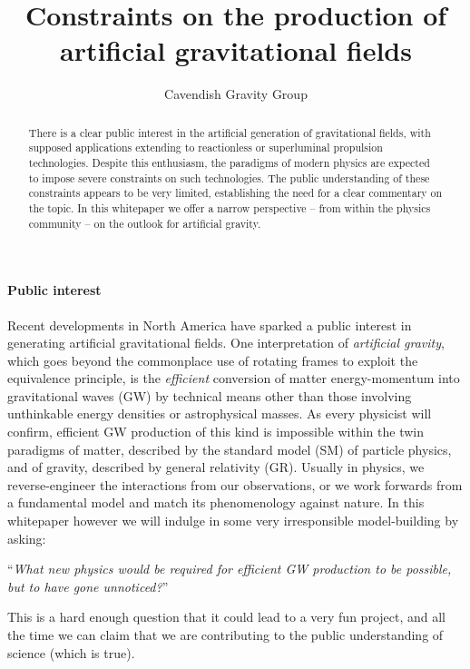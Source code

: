 \documentclass[aps,prd,reprint,preprintnumbers,showpacs,floatfix,nofootinbib,superscript address,longbibliography]{revtex4-2}
\begin{document}
\title{Constraints on the production of artificial gravitational fields}

\author{Cavendish Gravity Group}


\begin{abstract}
	There is a clear public interest in the artificial generation of gravitational fields, with supposed applications extending to reactionless or superluminal propulsion technologies. Despite this enthusiasm, the paradigms of modern physics are expected to impose severe constraints on such technologies. The public understanding of these constraints appears to be very limited, establishing the need for a clear commentary on the topic. In this whitepaper we offer a narrow perspective -- from within the physics community -- on the outlook for artificial gravity.
\end{abstract}

\maketitle

\paragraph*{Public interest} Recent developments in North America have sparked a public interest in generating artificial gravitational fields. One interpretation of \emph{artificial gravity}, which goes beyond the commonplace use of rotating frames to exploit the equivalence principle, is the \emph{efficient} conversion of matter energy-momentum into gravitational waves (GW) by technical means other than those involving unthinkable energy densities or astrophysical masses. As every physicist will confirm, efficient GW production of this kind is impossible within the twin paradigms of matter, described by the standard model (SM) of particle physics, and of gravity, described by general relativity (GR). Usually in physics, we reverse-engineer the interactions from our observations, or we work forwards from a fundamental model and match its phenomenology against nature. In this whitepaper however we will indulge in some very irresponsible model-building by asking:
{
\center
``\textit{What new physics would be required for efficient GW production to be possible, but to have gone unnoticed?}''\par}
This is a hard enough question that it could lead to a very fun project, and all the time we can claim that we are contributing to the public understanding of science (which is true).
\end{document}
